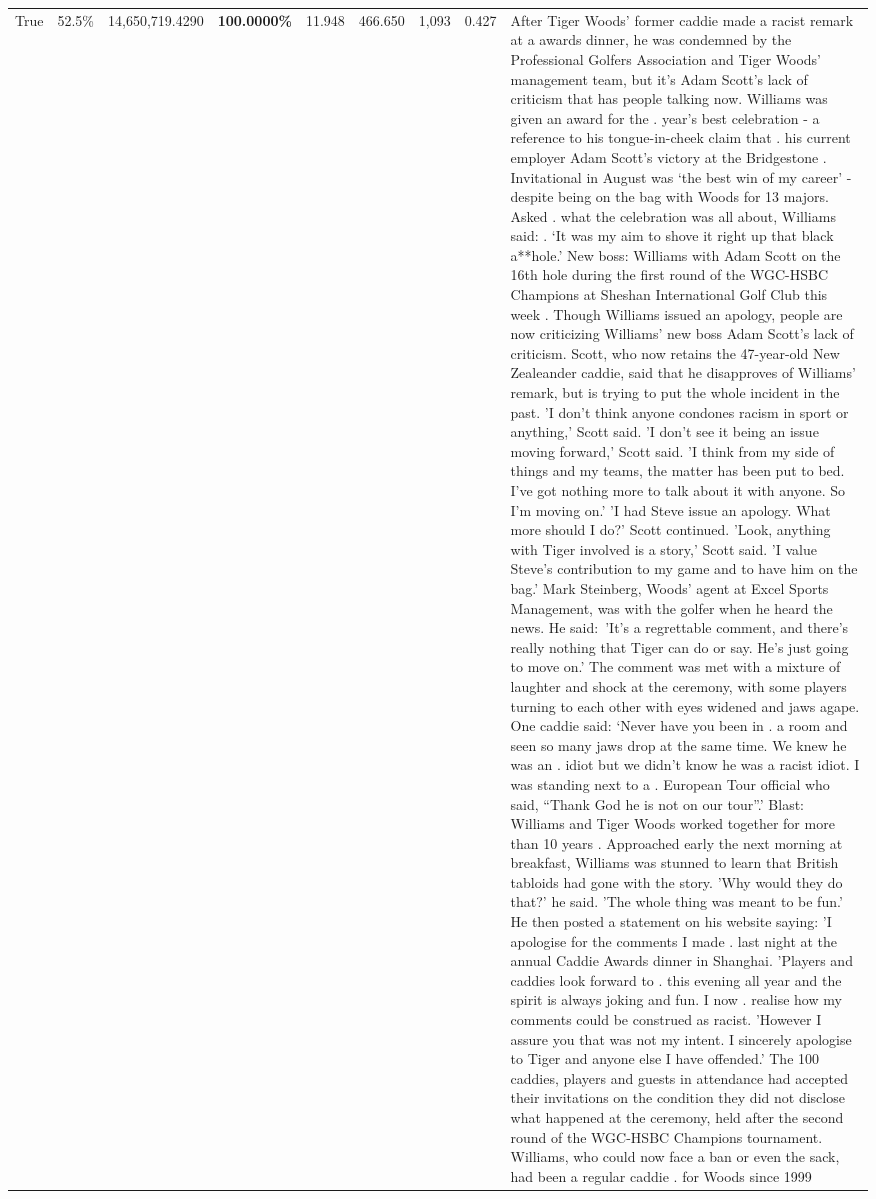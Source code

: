 \begin{table}[H]
\begin{tabular}{lllrlllll}
True & 52.5\% & 14,650,719.4290 & \bfseries \color{red} 100.0000\% & 11.948 & 466.650 & 1,093 & 0.427 & After Tiger Woods' former caddie made a racist remark at a awards dinner, he was condemned by the Professional Golfers Association and Tiger Woods' management team, but it's Adam Scott's lack of criticism that has people talking now. Williams was given an award for the . year’s best celebration - a reference to his tongue-in-cheek claim that . his current employer Adam Scott’s victory at the Bridgestone . Invitational in August was ‘the best win of my career’ - despite being on the bag with Woods for 13 majors. Asked . what the celebration was all about, Williams said: . ‘It was my aim to shove it right up that black a**hole.’ New boss: Williams with Adam Scott  on the 16th hole during the first round of the WGC-HSBC Champions at Sheshan International Golf Club this week . Though Williams issued an apology, people are now criticizing Williams' new boss Adam Scott's lack of criticism. Scott, who now retains the 47-year-old New Zealeander caddie, said that he disapproves of Williams' remark, but is trying to put the whole incident in the past. 'I don't think anyone condones racism in sport or anything,' Scott said. 'I don't see it being an issue moving forward,' Scott said. 'I think from my side of things and my teams, the matter has been put to bed. I've got nothing more to talk about it with anyone. So I'm moving on.' 'I had Steve issue an apology. What more should I do?' Scott continued. 'Look, anything with Tiger involved is a story,' Scott said. 'I value Steve's contribution to my game and to have him on the bag.' Mark Steinberg, Woods' agent at Excel Sports Management, was with the golfer when he heard the news. He said: 'It's a regrettable comment, and there's really nothing that Tiger can do or say. He's just going to move on.' The comment was met with a mixture of laughter and shock at the ceremony, with some players turning to each other with eyes widened and jaws agape. One caddie said: ‘Never have you been in . a room and seen so many jaws drop at the same time. We knew he was an . idiot but we didn’t know he was a racist idiot. I was standing next to a . European Tour official who said, “Thank God he is not on our tour”.’ Blast: Williams and Tiger Woods worked together for more than 10 years . Approached early the next morning at breakfast, Williams was stunned to learn that British tabloids had gone with the story. 'Why would they do that?' he said. 'The whole thing was meant to be fun.' He then posted a statement on his website saying: 'I apologise for the comments I made . last night at the annual Caddie Awards dinner in Shanghai. 'Players and caddies look forward to . this evening all year and the spirit is always joking and fun. I now . realise how my comments could be construed as racist. 'However I assure you that was not my intent. I sincerely apologise to Tiger and anyone else I have offended.' The 100 caddies, players and guests in attendance had accepted their invitations on the condition they did not disclose what happened at the ceremony, held after the second round of the WGC-HSBC Champions tournament. Williams, who could now face a ban or even the sack, had been a regular caddie . for Woods since 1999 
\end{tabular}
\end{table}
